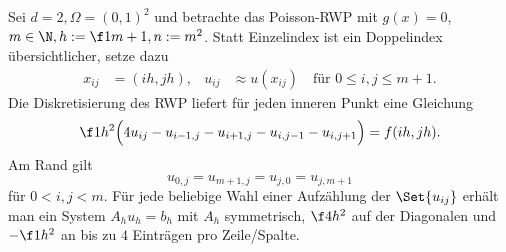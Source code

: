 \begin{ex} \label{2.9}
	Sei $d = 2, \Omega = (0,1)^2$ und betrachte das Poisson-RWP mit $g(x) = 0$, $m \in \N, h:= \f 1{m+1}, n := m^2$.
	Statt Einzelindex ist ein Doppelindex übersichtlicher, setze dazu
	\begin{align*}
		x_{ij} &= (ih, jh),&
		u_{ij} &\approx u(x_{ij}) \quad \text{für $0 \le i,j \le m+1$}.
	\end{align*}
	Die Diskretisierung des RWP liefert für jeden inneren Punkt eine Gleichung
	\[
		\f 1{h^2} \Big( 4 u_{ij} - u_{i-1,j} - u_{i+1,j} - u_{i,j-1} - u_{i,j+1}\Big)
		= f(ih, jh).
	\]
	Am Rand gilt
	\[
		u_{0,j} = u_{m+1,j} = u_{j,0} = u_{j,m+1}
	\]
	für $0 < i,j < m$.
	Für jede beliebige Wahl einer Aufzählung der $\Set{u_{ij}}$ erhält man ein System $A_h u_h = b_h$ mit $A_h$ symmetrisch, $\f 4{h^2}$ auf der Diagonalen und $-\f 1{h^2}$ an bis zu $4$ Einträgen pro Zeile/Spalte.


\end{ex}
